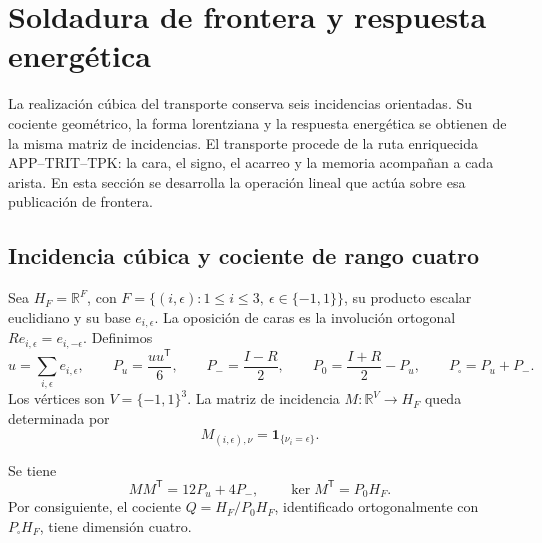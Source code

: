 
\section{Soldadura de frontera y respuesta energética}
\label{vii:sec:pantalla-respuesta}

La realización cúbica del transporte conserva seis incidencias orientadas.
Su cociente geométrico, la forma lorentziana y la respuesta energética
se obtienen de la misma matriz de incidencias. El transporte procede de
la ruta enriquecida APP--TRIT--TPK: la cara, el signo, el acarreo y la
memoria acompañan a cada arista. En esta sección se desarrolla la
operación lineal que actúa sobre esa publicación de frontera.

\subsection{Incidencia cúbica y cociente de rango cuatro}
\label{vii:sec:cociente-pantalla}

Sea \(H_F=\mathbb R^F\), con
\(F=\{(i,\epsilon):1\leq i\leq3,\ \epsilon\in\{-1,1\}\}\),
su producto escalar euclidiano y su base \(e_{i,\epsilon}\).
La oposición de caras es la involución ortogonal
\(Re_{i,\epsilon}=e_{i,-\epsilon}\). Definimos
\[
 u=\sum_{i,\epsilon}e_{i,\epsilon},\qquad
 P_u=\frac{uu^{\mathsf T}}6,\qquad P_-=\frac{I-R}{2},\qquad
 P_0=\frac{I+R}{2}-P_u,\qquad P_\square=P_u+P_-.
\]
Los vértices son \(V=\{-1,1\}^3\). La matriz de incidencia
\(M:\mathbb R^V\longrightarrow H_F\) queda determinada por
\[
 M_{(i,\epsilon),\nu}=\mathbf1_{\{\nu_i=\epsilon\}}.
\]

\begin{proposition}
\label{vii:prop:incidencia}
Se tiene
\[
 MM^{\mathsf T}=12P_u+4P_-,
 \qquad
 \ker M^{\mathsf T}=P_0H_F.
\]
Por consiguiente, el cociente
\(Q=H_F/P_0H_F\), identificado ortogonalmente con
\(P_\square H_F\), tiene dimensión cuatro.
\end{proposition}

